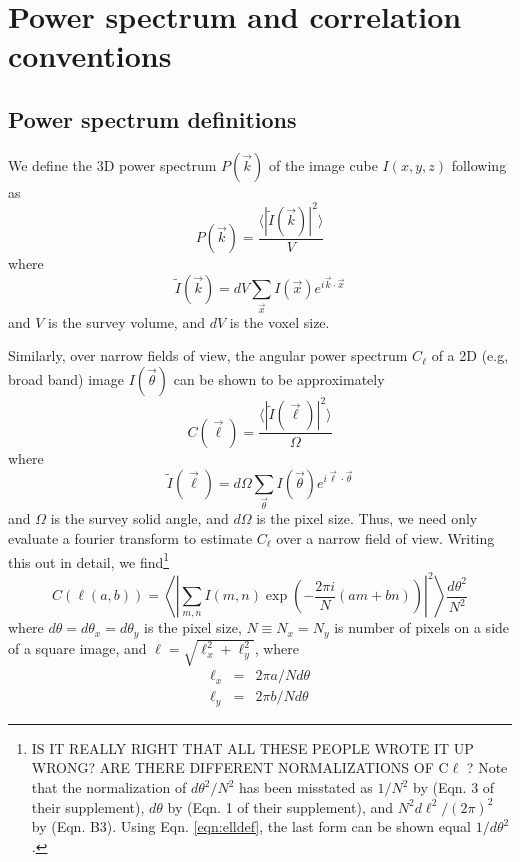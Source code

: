 \documentclass[preprint]{aastex}
\begin{document}
\section{Power spectrum and correlation conventions}
\label{sec:pspecconventions}

\subsection{Power spectrum definitions}

We define the 3D power spectrum $P(\vec{k})$ of the image cube $I(x,y,z)$ following \citet{ewallwice14} as 
\begin{equation}
	P(\vec{k}) = \frac{\langle|\tilde{I}(\vec{k})|^2\rangle}{V}
\end{equation}
where
\begin{equation}
	\tilde{I}(\vec{k})=dV\sum_{\vec{x}}I(\vec{x})e^{i\vec{k}\cdot\vec{x}}
\end{equation}
and $V$ is the survey volume, and $dV$ is the voxel size.

Similarly, over narrow fields of view, the angular power spectrum $C_\ell$ of a 2D (e.g, broad band) image $I(\vec{\theta})$ can be shown to be approximately
\begin{equation}
\label{eqn:Cldef0}
	C(\vec{\ell}) = \frac{\langle|\tilde{I}(\vec{\ell})|^2\rangle}{\Omega} 
\end{equation}
where
\begin{equation}
	\tilde{I}(\vec{\ell})=d\Omega\sum_{\vec{\theta}}I(\vec{\theta})e^{i\vec{\ell}\cdot\vec{\theta}}
\end{equation}
and $\Omega$ is the survey solid angle, and $d\Omega$ is the pixel size. Thus, we need only evaluate a fourier transform to estimate $C_\ell$ over a narrow field of view. Writing this out in detail, we find\footnote{IS IT REALLY RIGHT THAT ALL THESE PEOPLE WROTE IT UP WRONG? ARE THERE DIFFERENT NORMALIZATIONS OF C$\ell$ ? Note that the normalization of $d\theta^2/N^2$ has been misstated as $1/N^2$ by \citet{zemcov14} (Eqn. 3 of their supplement), $d\theta$ by \citet{cooray12} (Eqn. 1 of their supplement), and $N^2d\ell^2/(2\pi)^2$ by \citet{thacker15} (Eqn. B3). Using Eqn. \ref{eqn:elldef}, the last form can be shown equal $1/d\theta^2$.} 
\begin{equation}
\label{eqn:Cldef}
	C(\ell(a,b))=\left\langle\left|\sum_{m,n}I(m,n)\exp\left(-\frac{2\pi i}{N}  (am+bn)\right)\right|^2\right\rangle\frac{d\theta^2}{N^2}
\end{equation}
where $d\theta=d\theta_x=d\theta_y$ is the pixel size, $N\equiv N_x=N_y$ is number of pixels on a side of a square image, and $\ell=\sqrt{\ell_x^2+\ell_y^2}$, where 
\begin{eqnarray}
\ell_x&=&2\pi a/N d\theta \label{eqn:elldef}\\
\ell_y&=&2\pi b/Nd\theta \label{eqn:elldef2}
\end{eqnarray}
\end{document}

